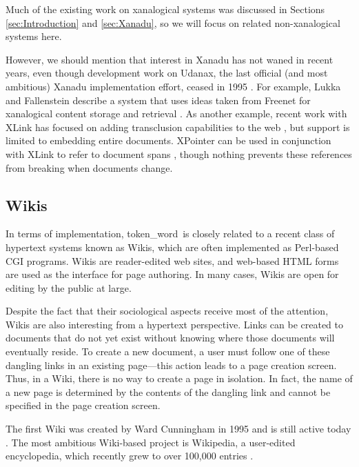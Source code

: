\documentclass{acm_proc_article-sp}
\newcommand{\tokenWord}{token\_word}
\begin{document}
Much of the existing work on xanalogical systems was discussed in Sections \ref{sec:Introduction} and \ref{sec:Xanadu}, so we will focus on related non-xanalogical systems here.

However, we should mention that interest in Xanadu has not waned in recent years, even though development work on Udanax, the last official (and most ambitious) Xanadu implementation effort, ceased in 1995 \cite{Udanax}.
For example, Lukka and Fallenstein describe a system that uses ideas taken from Freenet for xanalogical content storage and retrieval \cite{FreenetXanadu}.
As another example, recent work with XLink has focused on adding transclusion capabilities to the web \cite{Lowe2001}, but support is limited to embedding entire documents.
XPointer can be used in conjunction with XLink to refer to document spans \cite{Vitali2002}, though nothing prevents these references from breaking when documents change.






\subsection{Wikis}

In terms of implementation, \tokenWord \  is closely related to a recent class of hypertext systems known as Wikis, which are often implemented as Perl-based CGI programs.
Wikis are reader-edited web sites, and web-based HTML forms are used as the interface for page authoring.
In many cases, Wikis are open for editing by the public at large.

Despite the fact that their sociological aspects receive most of the attention, Wikis are also interesting from a hypertext perspective.
Links can be created to documents that do not yet exist without knowing where those documents will eventually reside.
To create a new document, a user must follow one of these dangling links in an existing page---this action leads to a page creation screen.
Thus, in a Wiki, there is no way to create a page in isolation.
In fact, the name of a new page is determined by the contents of the dangling link and cannot be specified in the page creation screen.



The first Wiki was created by Ward Cunningham in 1995 and is still active today \cite{WikiWikiWeb}.
The most ambitious Wiki-based project is Wikipedia, a user-edited encyclopedia, which recently grew to over 100,000 entries \cite{Wikipedia}.
\end{document}
